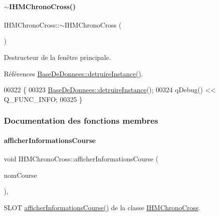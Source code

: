 \paragraph{\texorpdfstring{$\sim$\+I\+H\+M\+Chrono\+Cross()}{~IHMChronoCross()}}
{\footnotesize\ttfamily I\+H\+M\+Chrono\+Cross\+::$\sim$\+I\+H\+M\+Chrono\+Cross (\begin{DoxyParamCaption}{ }\end{DoxyParamCaption})}



Destructeur de la fenêtre principale. 



Références \hyperlink{class_base_de_donnees_a457401c0816b888c77ce915997545f4e}{Base\+De\+Donnees\+::detruire\+Instance()}.


\begin{DoxyCode}
00322 \{
00323     \hyperlink{class_base_de_donnees_a457401c0816b888c77ce915997545f4e}{BaseDeDonnees::detruireInstance}();
00324     qDebug() << Q\_FUNC\_INFO;
00325 \}
\end{DoxyCode}


\subsubsection{Documentation des fonctions membres}
\mbox{\label{class_i_h_m_chrono_cross_afe18e84e4df15c15921f2bdcfc6f4396}} 
\paragraph{\texorpdfstring{afficher\+Informations\+Course}{afficherInformationsCourse}}
{\footnotesize\ttfamily void I\+H\+M\+Chrono\+Cross\+::afficher\+Informations\+Course (\begin{DoxyParamCaption}\item[{Q\+String}]{nom\+Course }\end{DoxyParamCaption})\hspace{0.3cm}{\ttfamily [private]}, {\ttfamily [slot]}}



S\+L\+OT \hyperlink{class_i_h_m_chrono_cross_afe18e84e4df15c15921f2bdcfc6f4396}{afficher\+Informations\+Course()} de la classe \hyperlink{class_i_h_m_chrono_cross}{I\+H\+M\+Chrono\+Cross}. 

